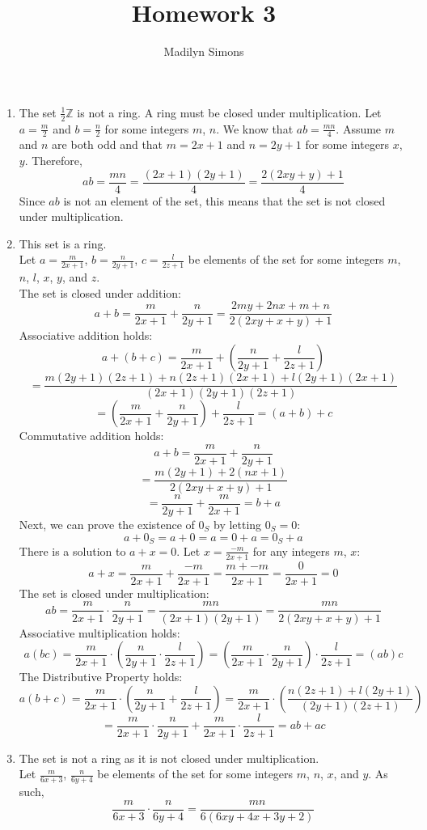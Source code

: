 \documentclass{article}
\title{Homework 3}
\author{Madilyn Simons}
\date{}
\begin{document}
\maketitle

\begin{enumerate}

\item The set $\frac{1}{2}\mathbb{Z}$ is not a ring.  A ring must be closed under
multiplication.  Let $a = \frac{m}{2}$ and $b = \frac{n}{2}$ for some integers
$m$, $n$.  We know that $ab = \frac{mn}{4}$.  Assume $m$ and $n$ are both odd and
that $m = 2x + 1$ and $n = 2y + 1$ for some integers $x$, $y$.  Therefore,
\[
ab = \frac{mn}{4} = \frac{(2x+1)(2y+1)}{4} = \frac{2(2xy+y)+1}{4}
\]
Since $ab$ is not an element of the set, this means that the set is not closed
under multiplication.

\item This set is a ring. \\
Let $a = \frac{m}{2x+1}$, $b=\frac{n}{2y+1}$, $c=\frac{l}{2z+1}$ be elements of
the set for some integers $m$, $n$, $l$, $x$, $y$, and $z$.\\
The set is closed under addition:
\[
a + b = \frac{m}{2x+1} + \frac{n}{2y+1} = \frac{2my+2nx+m+n}{2(2xy+x+y)+1}
\]
Associative addition holds:
\[
a+(b+c) = \frac{m}{2x+1} + (\frac{n}{2y+1} + \frac{l}{2z+1})
\]
\[
= \frac{m(2y+1)(2z+1) + n(2z+1)(2x+1) + l(2y+1)(2x+1)}{(2x+1)(2y+1)(2z+1)}
\]
\[
= (\frac{m}{2x+1} + \frac{n}{2y+1}) + \frac{l}{2z+1} = (a+b)+c
\]
Commutative addition holds:
\[
a + b = \frac{m}{2x+1} + \frac{n}{2y+1}
\]
\[
= \frac{m(2y+1) + 2(nx+1)}{2(2xy+x+y)+1}
\]
\[
= \frac{n}{2y+1} + \frac{m}{2x+1} = b + a
\]
Next, we can prove the existence of $0_S$ by letting $0_S = 0$:
\[
a + 0_S = a + 0 = a = 0 + a = 0_S + a
\]
There is a solution to $a + x = 0$.  Let $x = \frac{-m}{2x+1}$ for any integers $m$, $x$:
\[
a + x = \frac{m}{2x+1} + \frac{-m}{2x+1} = \frac{m + {-m}}{2x+1} = \frac{0}{2x+1} = 0
\]
The set is closed under multiplication:
\[
ab = \frac{m}{2x+1}\cdot\frac{n}{2y+1} = \frac{mn}{(2x+1)(2y+1)} = \frac{mn}{2(2xy+x+y)+1}
\]
Associative multiplication holds:
\[
a(bc) = \frac{m}{2x+1}\cdot(\frac{n}{2y+1}\cdot\frac{l}{2z+1}) = (\frac{m}{2x+1}\cdot\frac{n}{2y+1})\cdot\frac{l}{2z+1}
= (ab)c
\]
The Distributive Property holds:
\[
a(b+c) = \frac{m}{2x+1}\cdot(\frac{n}{2y+1}+\frac{l}{2z+1})
= \frac{m}{2x+1}\cdot(\frac{n(2z+1) + l(2y+1)}{(2y+1)(2z+1)})
\]
\[
= \frac{m}{2x+1}\cdot\frac{n}{2y+1} + \frac{m}{2x+1}\cdot\frac{l}{2z+1}
=ab+ac
\]

\item The set is not a ring as it is not closed under multiplication.\\
Let $\frac{m}{6x+3}$, $\frac{n}{6y+4}$ be elements of the set for some integers
$m$, $n$, $x$, and $y$.  As such,
\[
\frac{m}{6x+3}\cdot\frac{n}{6y+4} = \frac{mn}{6(6xy+4x+3y+2)}
\]


\end{enumerate}
\end{document}
